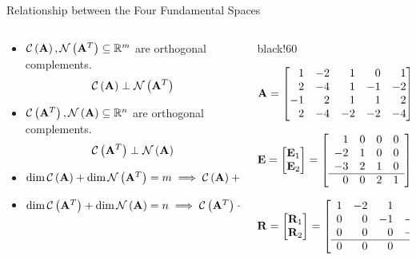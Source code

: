 \documentclass[aspectratio=169]{beamer}
\def\mf{\ensuremath\mathbf}
\def\mb{\ensuremath\mathbb}
\def\mc{\ensuremath\mathcal}
\def\lp{\ensuremath\left(}
\def\rp{\ensuremath\right)}
\newcommand{\demoex}[2]{\onslide<#1->\begin{color}{black!60} #2 \end{color}}
\begin{document}
\begin{frame}[t]{Relationship between the Four Fundamental Spaces}
\begin{columns}
\begin{column}{0.475\textwidth}
\begin{small}
\begin{itemize}
    \item $\mc{C}\lp\mf{A}\rp, \mc{N}\lp\mf{A}^T\rp \subseteq \mb{R}^m$ are orthogonal complements.
    $$\mc{C}\lp\mf{A}\rp \perp \mc{N}\lp\mf{A}^T\rp$$

    \item $\mc{C}\lp\mf{A}^T\rp, \mc{N}\lp\mf{A}\rp \subseteq \mb{R}^n$ are orthogonal complements.
    $$\mc{C}\lp\mf{A}^T\rp \perp \mc{N}\lp\mf{A}\rp$$
    
    \item $\dim \mc{C}\lp\mf{A}\rp + \dim \mc{N}\lp\mf{A}^T\rp = m \implies \mc{C}\lp\mf{A}\rp + \mc{N}\lp\mf{A}^T\rp = \mb{R}^m$
    
    \item $\dim \mc{C}\lp\mf{A}^T\rp + \dim \mc{N}\left(\mf{A}\rp = n \implies \mc{C}\lp\mf{A}^T\rp + \mc{N}\lp\mf{A}\rp = \mb{R}^n$
\end{itemize}
\end{small}
\end{column}
\begin{column}{0.525\textwidth}
\demoex{2}{
\begin{scriptsize}
\[ \mf{A} = \begin{bmatrix*}[r]
1 & -2 & 1 & 0 & 1 \\
2 & -4 & 1 & -1 & -2 \\
-1 & 2 & 1 & 1 & 2 \\
2 & -4 & -2 & -2 & -4 \\
\end{bmatrix*} \]

\[ \mf{E} = \begin{bmatrix*}[r]\mf{E}_1\\\mf{E}_2\end{bmatrix*} = \mleft[
\begin{array}{r r r r}
1 & 0 & 0 & 0 \\
-2 & 1 & 0 & 0 \\
-3 & 2 & 1 & 0 \\
\hline
0 & 0 & 2 & 1 \\
\end{array} \mright] \]

\[ \mf{R} = \begin{bmatrix*}[r]\mf{R}_1\\\mf{R}_2\end{bmatrix*} = \mleft[
\begin{array}{r r r r r} 
1 & -2 & 1 & 0 & 1 \\
0 & 0 & -1 & -1 & -4 \\
0 & 0 & 0 & -1 & -5 \\
\hline
0 & 0 & 0 & 0 & 0
\end{array}\mright] \]
\end{scriptsize}
}


\end{column}
\end{columns}
\end{frame}
\end{document}
